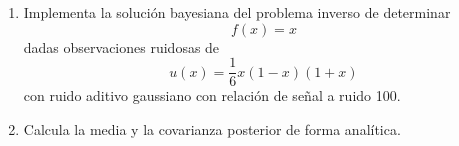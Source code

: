 \documentclass[12pt,spanish,mexico]{article}
\numberwithin{equation}{section}
\theoremstyle{definition}
\theoremstyle{remark}
\newenvironment{solution}{\begin{proof}[Solución]}{\end{proof}}
\begin{document}
\begin{enumerate}
\begin{solution}
La verosimilitud está dada por:
\[
p(b|x) \propto \exp\left(-\frac{\lambda}{2}\|Ax - b\|^2\right)
\]
donde $\lambda = 1/\sigma^2$ es la precisión del ruido.

Para el prior, consideramos un GMRF con media $\mu$:
\[
p(x) \propto \exp\left(-\frac{1}{2}(x-\mu)^T Q (x-\mu)\right)
\]
donde $Q$ es la matriz de precisión. En una malla uniforme con paso $h$, para un GMRF de primer orden:
\[
[Q]_{ij} = \frac{\delta}{h^2}
\begin{cases}
n_i, & i = j \\
-1, & j \in \partial_i \\
0, & \text{en otro caso}
\end{cases}
\]
donde $\partial_i$ son los vecinos del nodo $i$, $n_i = |\partial_i|$ es el número de vecinos, y $\delta > 0$ es un parámetro de regularización.

Para puntos interiores: $n_i = 2$, $Q_{ii} = 2\delta/h^2$, $Q_{i,i\pm1} = -\delta/h^2$.
Para puntos en la frontera: $n_i = 1$, $Q_{ii} = \delta/h^2$, y solo un vecino.

La distribución posterior es:
\[
p(x|b) \propto p(b|x)p(x) \propto \exp\left(-\frac{1}{2}(x-\mu_{\text{post}})^T \Sigma_{\text{post}}^{-1} (x-\mu_{\text{post}})\right)
\]
\end{solution}
\item Implementa la solución bayesiana del problema inverso de determinar
\[
f(x) = x
\]
dadas observaciones ruidosas de
\[
u(x) = \frac{1}{6}x(1-x)(1+x)
\]
con ruido aditivo gaussiano con relación de señal a ruido 100.

\item Calcula la media y la covarianza posterior de forma analítica.


\end{enumerate}
\end{document}
